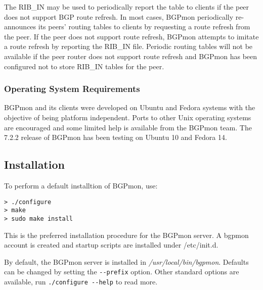 The RIB\_IN may be used to periodically report the table to clients if the peer does not support BGP route refresh.
In most cases, BGPmon periodically re-announces its peers' routing tables to clients by requesting a route refresh from the peer.
If the peer does not support route refresh,  BGPmon attempts to imitate a route refresh by reporting the RIB\_IN file.
Periodic routing tables will not be available if the peer router does not support route refresh and BGPmon has been configured not to store RIB\_IN tables for the peer.

\subsubsection{Operating System Requirements}

BGPmon and its clients were developed on Ubuntu and Fedora systems with the objective of being platform independent.   
Ports to other Unix operating systems are encouraged and some limited help is available from the BGPmon team.     
The 7.2.2 release of BGPmon has been testing on Ubuntu 10 and Fedora 14.

\subsection{Installation}
\label{sec:install}

To perform a default installtion of  BGPmon, use:\\

\begin{Verbatim}[frame=single]
> ./configure
> make 
> sudo make install
\end{Verbatim}

This is the preferred installation procedure for the BGPmon server. 
A bgpmon account is created and startup scripts are installed under /etc/init.d.

By default, the BGPmon server is installed in \emph{/usr/local/bin/bgpmon}.
Defaults can be changed by setting the \verb|--prefix| option. 
Other standard options are available, run \verb|./configure --help| to read more.


